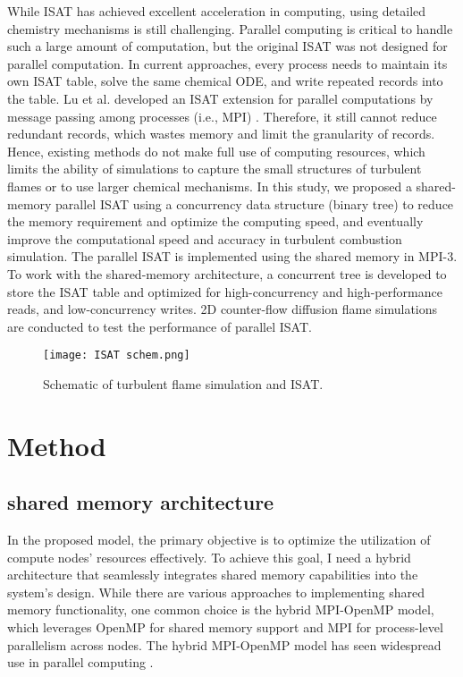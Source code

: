 While ISAT has achieved excellent acceleration in computing, using detailed chemistry mechanisms is still challenging. Parallel computing is critical to handle such a large amount of computation, but the original ISAT was not designed for parallel computation. In current approaches, every process needs to maintain its own ISAT table, solve the same chemical ODE, and write repeated records into the table. Lu et al. developed an ISAT extension for parallel computations by message passing among processes (i.e., MPI) \cite{lu2005investigation}. Therefore, it still cannot reduce redundant records, which wastes memory and limit the granularity of records.
Hence, existing methods do not make full use of computing resources, which limits the ability of simulations to capture the small structures of turbulent flames or to use larger chemical mechanisms. 
In this study, we proposed a shared-memory parallel ISAT using a concurrency data structure (binary tree) to reduce the memory requirement and optimize the computing speed, and eventually improve the computational speed and accuracy in turbulent combustion simulation. The parallel ISAT is implemented using the shared memory in MPI-3. To work with the shared-memory architecture, a concurrent tree is developed to store the ISAT table and optimized for high-concurrency and high-performance reads, and low-concurrency writes. 2D counter-flow diffusion flame simulations are conducted to test the performance of parallel ISAT.



\begin{figure}[htbp]
    \centering
\texttt{[image: ISAT schem.png]} 
\caption{Schematic of turbulent flame simulation and ISAT.}
\label{ISAT_Schematic} 
\end{figure}


\section{Method}
\subsection{shared memory architecture}
In the proposed model, the primary objective is to optimize the utilization of compute nodes' resources effectively. To achieve this goal, I need a hybrid architecture that seamlessly integrates shared memory capabilities into the system's design. While there are various approaches to implementing shared memory functionality, one common choice is the hybrid MPI-OpenMP model, which leverages OpenMP for shared memory support and MPI for process-level parallelism across nodes. The hybrid MPI-OpenMP model has seen widespread use in parallel computing \cite{ouro2019scalability,he2020structured,zhong2020efficien}.

